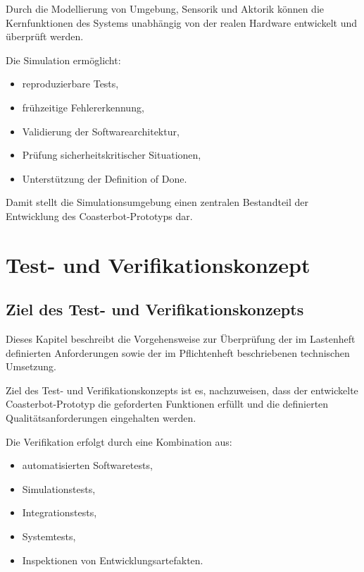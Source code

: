 Durch die Modellierung von Umgebung, Sensorik und Aktorik können die
Kernfunktionen des Systems unabhängig von der realen Hardware entwickelt
und überprüft werden.

Die Simulation ermöglicht:

\begin{itemize}
\tightlist
\item
  reproduzierbare Tests,
\item
  frühzeitige Fehlererkennung,
\item
  Validierung der Softwarearchitektur,
\item
  Prüfung sicherheitskritischer Situationen,
\item
  Unterstützung der Definition of Done.
\end{itemize}

Damit stellt die Simulationsumgebung einen zentralen Bestandteil der
Entwicklung des Coasterbot-Prototyps dar.

\section{Test- und
Verifikationskonzept}\label{test--und-verifikationskonzept}

\subsection{Ziel des Test- und
Verifikationskonzepts}\label{ziel-des-test--und-verifikationskonzepts}

Dieses Kapitel beschreibt die Vorgehensweise zur Überprüfung der im
Lastenheft definierten Anforderungen sowie der im Pflichtenheft
beschriebenen technischen Umsetzung.

Ziel des Test- und Verifikationskonzepts ist es, nachzuweisen, dass der
entwickelte Coasterbot-Prototyp die geforderten Funktionen erfüllt und
die definierten Qualitätsanforderungen eingehalten werden.

Die Verifikation erfolgt durch eine Kombination aus:

\begin{itemize}
\tightlist
\item
  automatisierten Softwaretests,
\item
  Simulationstests,
\item
  Integrationstests,
\item
  Systemtests,
\item
  Inspektionen von Entwicklungsartefakten.
\end{itemize}

